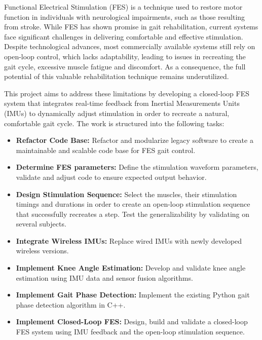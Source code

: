 
Functional Electrical Stimulation (FES) is a technique used to restore motor function in individuals with neurological impairments, such as those resulting from stroke. While FES has shown promise in gait rehabilitation, current systems face significant challenges in delivering comfortable and effective stimulation. Despite technological advances, most commercially available systems still rely on open-loop control, which lacks adaptability, leading to issues in recreating the gait cycle, excessive muscle fatigue and discomfort. As a consequence, the full potential of this valuable rehabilitation technique remains underutilized.

This project aims to address these limitations by developing a closed-loop FES system that integrates real-time feedback from Inertial Measurements Units (IMUs) to dynamically adjust stimulation in order to recreate a natural, comfortable gait cycle. The work is structured into the following tasks:
\begin{itemize}
    \item \textbf{Refactor Code Base:} Refactor and modularize legacy software to create a maintainable and scalable code base for FES gait control.
    \item \textbf{Determine FES parameters:} Define the stimulation waveform parameters, validate and adjust code to ensure expected output behavior.
    \item \textbf{Design Stimulation Sequence:} Select the muscles, their stimulation timings and durations in order to create an open-loop stimulation sequence that successfully recreates a step. Test the generalizability by validating on several subjects.
    \item \textbf{Integrate Wireless IMUs:} Replace wired IMUs with newly developed wireless versions.
    \item \textbf{Implement Knee Angle Estimation:} Develop and validate knee angle estimation using IMU data and sensor fusion algorithms.
    \item \textbf{Implement Gait Phase Detection:} Implement the existing Python gait phase detection algorithm in C++.
    \item \textbf{Implement Closed-Loop FES:} Design, build and validate a closed-loop FES system using IMU feedback and the open-loop stimulation sequence.
\end{itemize}

